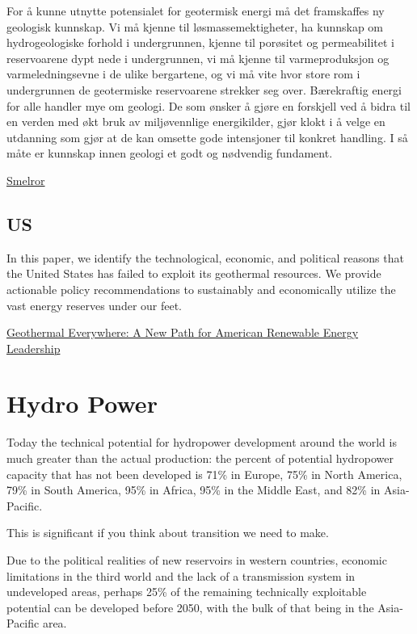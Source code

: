 \documentclass[
]{book}
\begin{document}
For å kunne utnytte potensialet for geotermisk energi må det framskaffes ny geologisk kunnskap. Vi må kjenne til løsmassemektigheter, ha kunnskap om hydrogeologiske forhold i undergrunnen, kjenne til porøsitet og permeabilitet i reservoarene dypt nede i undergrunnen, vi må kjenne til varmeproduksjon og varmeledningsevne i de ulike bergartene, og vi må vite hvor store rom i undergrunnen de geotermiske reservoarene strekker seg over. Bærekraftig energi for alle handler mye om geologi. De som ønsker å gjøre en forskjell ved å bidra til en verden med økt bruk av miljøvennlige energikilder, gjør klokt i å velge en utdanning som gjør at de kan omsette gode intensjoner til konkret handling. I så måte er kunnskap innen geologi et godt og nødvendig fundament.

\href{https://www.geoforskning.no/blogg/item/baerekraftig-energi-for-alle}{Smelror}

\hypertarget{us}{%
\section{US}\label{us}}

In this paper, we identify the technological, economic, and political reasons that the United States has failed to exploit its geothermal resources. We provide actionable policy recommendations to sustainably and economically utilize the vast energy reserves under our feet.

\href{https://inn\%20ovationfrontier.org/geothermal-everywhere-a-new-path-for-american-renewable-energy-leade\%20rship/}{Geothermal Everywhere: A New Path for American Renewable Energy Leadership}

\hypertarget{hydro-power}{%
\chapter{Hydro Power}\label{hydro-power}}

Today the technical potential for hydropower development around the world is much greater than the actual production: the percent of potential hydropower capacity that has not been developed is 71\% in Europe, 75\% in North America, 79\% in South America, 95\% in Africa, 95\% in the Middle East, and 82\% in Asia-Pacific.

This is significant if you think about transition we need to make.

Due to the political realities of new reservoirs in western countries, economic limitations in the third world and the lack of a transmission system in undeveloped areas, perhaps 25\% of the remaining technically exploitable potential can be developed before 2050, with the bulk of that being in the Asia-Pacific area.
\end{document}
